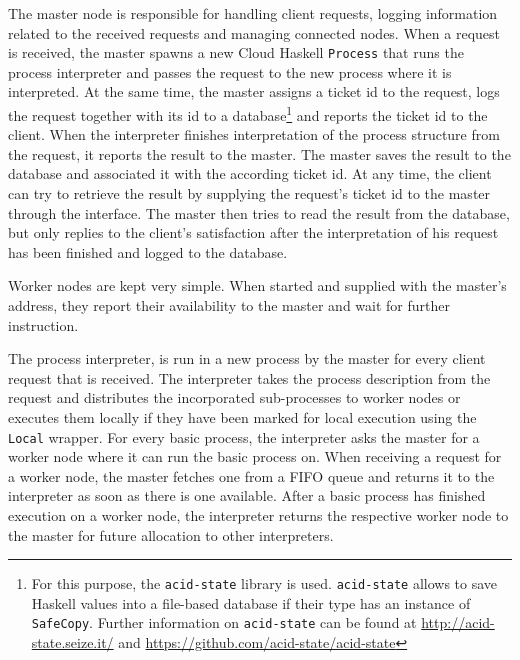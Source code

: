 The master node is responsible for handling client requests, logging information related to the received requests and managing connected nodes. When a request is received, the master spawns a new \textsf{Cloud Haskell} \texttt{Process} that runs the process interpreter and passes the request to the new process where it is interpreted. At the same time, the master assigns a ticket id to the request, logs the request together with its id to a database\footnote{For this purpose, the \texttt{acid-state} library is used. \texttt{acid-state} allows to save \textsf{Haskell} values into a file-based database if their type has an instance of \texttt{SafeCopy}. Further information on \texttt{acid-state} can be found at \url{http://acid-state.seize.it/} and \url{https://github.com/acid-state/acid-state}} and reports the ticket id to the client. When the interpreter finishes interpretation of the process structure from the request, it reports the result to the master. The master saves the result to the database and associated it with the according ticket id. At any time, the client can try to retrieve the result by supplying the request's ticket id to the master through the interface. The master then tries to read the result from the database, but only replies to the client's satisfaction after the interpretation of his request has been finished and logged to the database.

Worker nodes are kept very simple. When started and supplied with the master's address, they report their availability to the master and wait for further instruction.

The process interpreter, is run in a new process by the master for every client request that is received. The interpreter takes the process description from the request and distributes the incorporated sub-processes to worker nodes or executes them locally if they have been marked for local execution using the \texttt{Local} wrapper. For every basic process, the interpreter asks the master for a worker node where it can run the basic process on. When receiving a request for a worker node, the master fetches one from a FIFO queue and returns it to the interpreter as soon as there is one available. After a basic process has finished execution on a worker node, the interpreter returns the respective worker node to the master for future allocation to other interpreters. %


